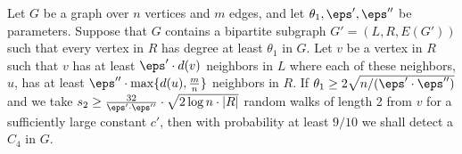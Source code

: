 \begin{claim}\label{clm:C4-ub2}
Let $G$ be a graph over $n$ vertices and $m$ edges, and let $\theta_1, \eps', \eps''$ be parameters.
Suppose that $G$ contains a bipartite subgraph $G' = (L,R,E(G'))$ such that every vertex in $R$ has degree at least $\theta_1$ in $G$. 
Let $v$ be a vertex in $R$ such that $v$ has at least $\eps' \cdot d(v)$ neighbors in $L$ where each  of these neighbors, $u$, has at least $\eps'' \cdot \max\{d(u),\frac{m}{n}\}$ neighbors in $R$. %
If $\theta_1\geq 2\sqrt{n/(\eps'\cdot \eps'')}$ and we take $s_2 \geq \frac{32}{\eps'\cdot \eps''}\cdot \sqrt{2\log n\cdot |R|}$ random walks of length 2 from $v$ for a sufficiently large constant $c'$, then with probability at least $9/10$ we shall detect a $C_4$ in $G$.
\end{claim}

